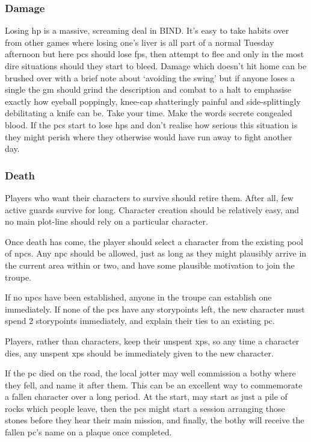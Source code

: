 \begin{multicols}{2}
\subsubsection{Damage}

Losing \gls{hp} is a massive, screaming deal in BIND.
It's easy to take habits over from other games where losing one's liver is all part of a normal Tuesday afternoon but here \glspl{pc} should lose \glspl{fp}, then attempt to flee and only in the most dire situations should they start to bleed.
Damage which doesn't hit home can be brushed over with a brief note about `avoiding the swing' but if anyone loses a single  the \gls{gm} should grind the description and combat to a halt to emphasise exactly how eyeball poppingly, knee-cap shatteringly painful and side-splittingly debilitating a knife can be.
Take your time.
Make the words secrete congealed blood.
If the \glspl{pc} start to lose \glspl{hp} and don't realise how serious this situation is they might perish where they otherwise would have run away to fight another day.

\subsubsection{Death}
\label{pcdeath}

Players who want their characters to survive should retire them.
After all, few active \glspl{guard} survive for long.
Character creation should be relatively easy, and no main plot-line should rely on a particular character.

Once death has come, the player should select a character from the existing pool of \glspl{npc}\iftoggle{stories}{brought into the world with \glspl{storypoint}}{}.
Any \gls{npc} should be allowed, just as long as they might plausibly arrive in the current area within  or two, and have some plausible motivation to join the troupe.

If no \glspl{npc} have been established, anyone in the troupe can establish one immediately.
If none of the \glspl{pc} have any \glspl{storypoint} left, the new character must spend 2 \glspl{storypoint} immediately, and explain their ties to an existing \gls{pc}.

Players, rather than characters, keep their unspent \glspl{xp}, so any time a character dies, any unspent \glspl{xp} should be immediately given to the new character.

If the \gls{pc} died on the road, the local \gls{jotter} may well commission a \gls{bothy} where they fell, and name it after them.
This can be an excellent way to commemorate a fallen character over a long period.
At the start,  may start as just a pile of rocks which people leave, then the \glspl{pc} might start a session arranging those stones before they hear their main mission, and finally, the \gls{bothy} will receive the fallen \gls{pc}'s name on a plaque once completed.


\end{multicols}
